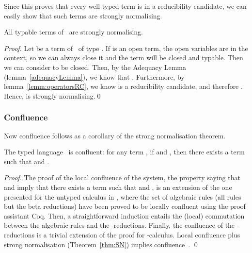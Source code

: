 \noindent Since this proves that every well-typed term is in a reducibility
candidate, we can easily show that such terms are strongly normalising.

\begin{theorem}\label{thm:SN}
  All typable terms of \CA\ are strongly normalising.
\end{theorem}

\begin{proof}
  Let  be a term of \CA\ of type . If  is an open term, the open variables are in the context, so we can always close it and the term will be closed and typable. Then we can consider  to be closed. Then, by the Adequacy
  Lemma (lemma~\ref{adequacyLemma}), we know that . Furthermore, by lemma~\ref{lemm:operatorsRC},
  we know  is a reducibility candidate, and
  therefore . Hence,
   is strongly normalising.\qed 
\end{proof}

\subsubsection{Confluence}\label{sec:conf}

Now confluence follows as a corollary of the strong normalisation theorem.

\begin{corollary}[Confluence]\label{cor:confluenceADD}
 The typed language \CA\ is confluent: for any term , if  and , then there exists a term  such that  and .
\end{corollary}
\begin{proof}
  The proof of the local confluence of the system, \ie the property
  saying that  and  imply that there
  exists a term  such that  and , is an extension of the one presented for the untyped
  calculus in \cite{ArrighiDiazcaroValironDCM11}, where the set of
  algebraic rules (\ie all rules but the beta reductions) have
  been proved to be locally confluent using the proof assistant
  Coq. Then, a straightforward induction entails the (local) commutation
  between the algebraic rules and the -reductions. Finally,
  the confluence of the -reductions is a trivial extension of
  the proof for -calculus.
Local confluence plus strong normalisation (\cf Theorem~\ref{thm:SN}) implies confluence~\cite{Terese03}. \qed
\end{proof}
